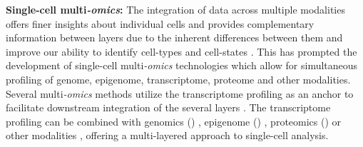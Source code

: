 \textbf{Single-cell multi\textit{-omics}: }The integration of data across multiple modalities offers finer insights about individual cells and provides complementary information between layers due to the inherent differences between them and improve our ability to identify cell-types and cell-states \textbf{\cite{flynn_single-cell_2023}}. This has prompted the development of single-cell multi\textit{-omics} technologies which allow for simultaneous profiling of genome, epigenome, transcriptome, proteome and other modalities. Several multi\textit{-omics} methods utilize the transcriptome profiling as an anchor to facilitate downstream integration of the several layers \textbf{\cite{baysoy_technological_2023}}. The transcriptome profiling can be combined with genomics () \textbf{\cite{macaulay_gt-seq_2015}}, epigenome () \textbf{\cite{angermueller_parallel_2016}}, proteomics () \textbf{\cite{stoeckius_simultaneous_2017}} or other modalities \textbf{\cite{dixit_perturb-seq_2016,singh_high-throughput_2019}}, offering a multi-layered approach to single-cell analysis.\\


